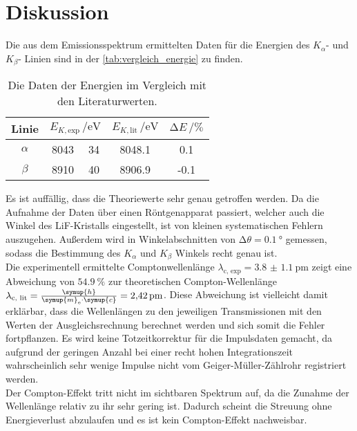 \section{Diskussion}
\label{sec:Diskussion}

Die aus dem Emissionsspektrum ermittelten Daten für die Energien des $K_{\alpha}$- und $K_{\beta}$- Linien sind in der \autoref{tab:vergleich_energie} zu finden. 

\begin{table}[H]
    \centering
    \caption{Die Daten der Energien im Vergleich mit den Literaturwerten.}
    \label{tab:vergleich_energie}
    \begin{tabular}{c c @{${} \pm {}$} c S[table-format=4.1] S[table-format=2.1]}
        \toprule
        Linie &  & {$E_{K, \text{lit}} \, / \si{\electronvolt} $ \cite{theoE}} & {$\increment E  \, / \si{\percent}$} \\
        \midrule
        $\alpha$ &  8043 & 34 & 8048.1 & 0.1 \\
        $\beta $  &  8910 & 40 & 8906.9 & -0.1 \\
        \bottomrule
    \end{tabular}
\end{table}

\noindent Es ist auffällig, dass die Theoriewerte sehr genau getroffen werden. Da die Aufnahme der Daten über einen Röntgenapparat passiert, welcher auch die 
Winkel des LiF-Kristalls eingestellt, ist von kleinen systematischen Fehlern auszugehen. Außerdem wird in Winkelabschnitten von $\increment \theta = \SI{0.1}{\degree}$ 
gemessen, sodass die Bestimmung des $K_{\alpha}$ und $K_{\beta}$ Winkels recht genau ist. \\


\noindent Die experimentell ermittelte Comptonwellenlänge $\lambda_{\text{c, exp}} = \SI{3.8(11)}{\pico\metre}$ zeigt eine Abweichung von $ \SI{54.9}{\percent}$
zur theoretischen Compton-Wellenlänge $\lambda_{\text{c, lit}} = \frac{\symup{h}}{\symup{m}_\text{e} \cdot \symup{c}} = \SI{2.42}{\pico\metre}$. Diese Abweichung ist vielleicht damit erklärbar, 
dass die Wellenlängen zu den jeweiligen Transmissionen mit den Werten der Ausgleichsrechnung berechnet werden und sich somit die Fehler fortpflanzen. 
Es wird keine Totzeitkorrektur für die Impulsdaten gemacht, da aufgrund der geringen Anzahl bei einer recht hohen Integrationszeit wahrscheinlich sehr wenige
Impulse nicht vom Geiger-Müller-Zählrohr registriert werden. \\
Der Compton-Effekt tritt nicht im sichtbaren Spektrum auf, da die Zunahme der Wellenlänge relativ zu ihr sehr gering ist. Dadurch scheint die Streuung ohne
Energieverlust abzulaufen und es ist kein Compton-Effekt nachweisbar. 